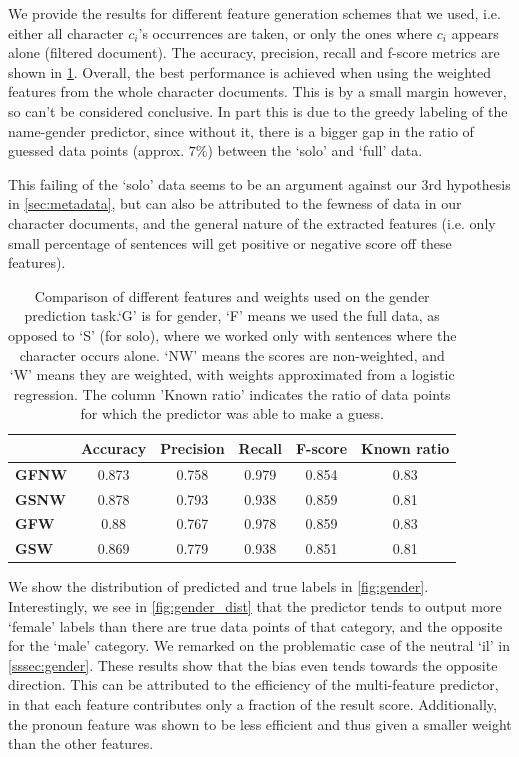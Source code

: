 We provide the results for different feature generation schemes that we used, i.e. either all character $c_i$'s occurrences are taken, or only the ones where $c_i$ appears alone (filtered document). The accuracy, precision, recall and f-score metrics are shown in \cref{tab:gender_metrics}. Overall, the best performance is achieved when using the weighted features from the whole character documents. This is by a small margin however, so can't be considered conclusive. In part this is due to the greedy labeling of the name-gender predictor, since without it, there is a bigger gap in the ratio of guessed data points (approx. $7\%$) between the `solo' and `full' data. 

This failing of the `solo' data seems to be an argument against our 3rd hypothesis in \cref{sec:metadata}, but can also be attributed to the fewness of data in our character documents, and the general nature of the extracted features (i.e. only small percentage of sentences will get positive or negative score off these features).

\begin{table}
\centering
\begin{tabular}{| >{\bf}l || *{5}{c|}}
\hline
		& Accuracy & Precision	& Recall & F-score & Known ratio\\ \hline \hline
GFNW	& 0.873 & 0.758 & 0.979	& 0.854	& 0.83 	\\ \hline
GSNW	& 0.878	& 0.793	& 0.938	& 0.859	& 0.81	\\ \hline
GFW		& 0.88	& 0.767	& 0.978	& 0.859	& 0.83 \\ \hline
GSW		& 0.869	& 0.779 & 0.938 & 0.851	& 0.81 \\ \hline

\end{tabular}
\caption{Comparison of different features and weights used on the gender prediction task.`G' is for gender, `F' means we used the full data, as opposed to `S' (for solo), where we worked only with sentences where the character occurs alone. `NW' means the scores are non-weighted, and `W' means they are weighted, with weights approximated from a logistic regression. The column 'Known ratio' indicates the ratio of data points for which the predictor was able to make a guess.}
\label{tab:gender_metrics}
\end{table}

We show the distribution of predicted and true labels in \cref{fig:gender}.
Interestingly, we see in \cref{fig:gender_dist} that the predictor tends to output more `female' labels than there are true data points of that category, and the opposite for the `male' category. We remarked on the problematic case of the neutral `il' in \cref{sssec:gender}. These results show that the bias even tends towards the opposite direction. This can be attributed to the efficiency of the multi-feature predictor, in that each feature contributes only a fraction of the result score. Additionally, the pronoun feature was shown to be less efficient and thus given a smaller weight than the other features. 

